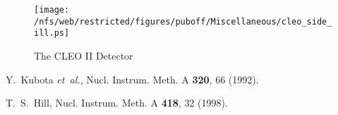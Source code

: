 \documentclass[aps,prd,preprint,superscriptaddress,tightenlines,nofootinbib]{revtex4}
\begin{document}
\begin{figure}
\texttt{[image: /nfs/web/restricted/figures/puboff/Miscellaneous/cleo\_side\_ill.ps]}
\caption{The CLEO II Detector}
\label{fig:cleo}
\end{figure}


\begin{thebibliography}{99}

Y.~Kubota {\it et~al.}, {Nucl. Instrum. Meth. A} \textbf{320}, {66} ({1992}).

T.~S.~Hill, {Nucl. Instrum. Meth. A} \textbf{{418}}, {32} ({1998}).

\end{thebibliography}
\end{document}

